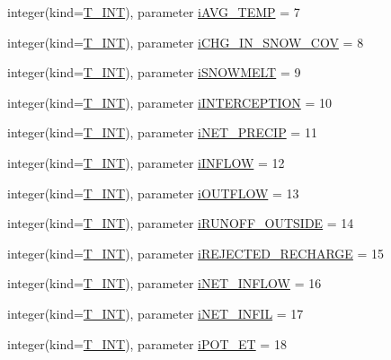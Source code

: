 \begin{DoxyCompactItemize}
integer(kind=\hyperlink{namespacetest_a6f91ebd89b58cfcc5da99faed9385c1e}{T\_\-INT}), parameter \hyperlink{namespacetest_a9b67c0e46fcbed22fc39728c65d345f9}{iAVG\_\-TEMP} = 7
\item 
integer(kind=\hyperlink{namespacetest_a6f91ebd89b58cfcc5da99faed9385c1e}{T\_\-INT}), parameter \hyperlink{namespacetest_a137ea45f2f434266edd47e7fc2b17c1b}{iCHG\_\-IN\_\-SNOW\_\-COV} = 8
\item 
integer(kind=\hyperlink{namespacetest_a6f91ebd89b58cfcc5da99faed9385c1e}{T\_\-INT}), parameter \hyperlink{namespacetest_a0d778816066d21ff37157e9e33ffa64d}{iSNOWMELT} = 9
\item 
integer(kind=\hyperlink{namespacetest_a6f91ebd89b58cfcc5da99faed9385c1e}{T\_\-INT}), parameter \hyperlink{namespacetest_a51eed4733166940c15eaafaa291fc55b}{iINTERCEPTION} = 10
\item 
integer(kind=\hyperlink{namespacetest_a6f91ebd89b58cfcc5da99faed9385c1e}{T\_\-INT}), parameter \hyperlink{namespacetest_aa863a0c7e87979b7d13b34f5afb7ecf5}{iNET\_\-PRECIP} = 11
\item 
integer(kind=\hyperlink{namespacetest_a6f91ebd89b58cfcc5da99faed9385c1e}{T\_\-INT}), parameter \hyperlink{namespacetest_a47075af8f8a4e815471731dc40aa7928}{iINFLOW} = 12
\item 
integer(kind=\hyperlink{namespacetest_a6f91ebd89b58cfcc5da99faed9385c1e}{T\_\-INT}), parameter \hyperlink{namespacetest_af391688ace32e5cfa1f0e6edf6499758}{iOUTFLOW} = 13
\item 
integer(kind=\hyperlink{namespacetest_a6f91ebd89b58cfcc5da99faed9385c1e}{T\_\-INT}), parameter \hyperlink{namespacetest_a4e979c97a931d097b815a1e8b62663f9}{iRUNOFF\_\-OUTSIDE} = 14
\item 
integer(kind=\hyperlink{namespacetest_a6f91ebd89b58cfcc5da99faed9385c1e}{T\_\-INT}), parameter \hyperlink{namespacetest_a0e9159063b997894c4a07927cbe42140}{iREJECTED\_\-RECHARGE} = 15
\item 
integer(kind=\hyperlink{namespacetest_a6f91ebd89b58cfcc5da99faed9385c1e}{T\_\-INT}), parameter \hyperlink{namespacetest_afafe0185b588b6c2503ad2cdfaccd5a7}{iNET\_\-INFLOW} = 16
\item 
integer(kind=\hyperlink{namespacetest_a6f91ebd89b58cfcc5da99faed9385c1e}{T\_\-INT}), parameter \hyperlink{namespacetest_aefca9a9826cf4312056bd27752aece6d}{iNET\_\-INFIL} = 17
\item 
integer(kind=\hyperlink{namespacetest_a6f91ebd89b58cfcc5da99faed9385c1e}{T\_\-INT}), parameter \hyperlink{namespacetest_a0b4cecb0049250b0df7313899555765c}{iPOT\_\-ET} = 18

\end{DoxyCompactItemize}
